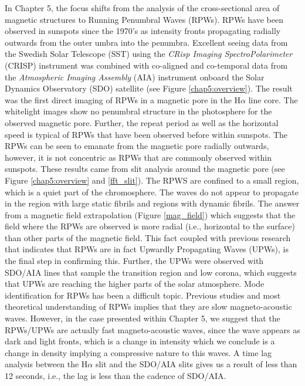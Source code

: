     In Chapter 5, the focus shifts from the analysis of the cross-sectional area of magnetic structures to Running Penumbral Waves (RPWs).
    RPWs have been observed in sunspots since the 1970's as intensity fronts propagating radially outwards from the outer umbra into the penumbra.
    Excellent seeing data from the Swedish Solar Telescope (SST) using the \textit{CRisp Imaging SpectroPolarimeter} (CRISP) instrument was combined with co-aligned and co-temporal data from the \textit{Atmospheric Imaging Assembly} (AIA) instrument onboard the Solar Dynamics Observatory (SDO) satellite (see Figure \ref{chap5:overview}).
    The result was the first direct imaging of RPWs in a magnetic pore in the H$\alpha$ line core.
    The whitelight images show no penumbral structure in the photosphere for the observed magnetic pore.
    Further, the repeat period as well as the horizontal speed is typical of RPWs that have been observed before within sunspots.
    The RPWs can be seen to emanate from the magnetic pore radially outwards, however, it is not concentric as RPWs that are commonly observed within sunspots.
    These results came from slit analysis around the magnetic pore (see Figure \ref{chap5:overview} and \ref{fft_slit}).
    The RPWS are confined to a small region, which is a quiet part of the chromosphere.
    The waves do not appear to propagate in the region with large static fibrils and regions with dynamic fibrils.
    The answer from a magnetic field extrapolation (Figure \ref{mag_field}) which suggests that the field where the RPWs are observed is more radial (i.e., horizontal to the surface) than other parts of the magnetic field.
    This fact coupled with previous research that indicates that RPWs are in fact Upwardly Propagating Waves (UPWs), is the final step in confirming this.     
    Further, the UPWs were observed with SDO/AIA lines that sample the transition region and low corona, which suggests that UPWs are reaching the higher parts of the solar atmosphere.
    Mode identification for RPWs has been a difficult topic. 
    Previous studies and most theoretical understanding of RPWs implies that they are slow magneto-acoustic waves.
    However, in the case presented within Chapter 5, we suggest that the RPWs/UPWs are actually fast magneto-acoustic waves, since the wave appears as dark and light fronts, which is a change in intensity which we conclude is a change in density implying a compressive nature to this waves.
    A time lag analysis between the H$\alpha$ slit and the SDO/AIA slits gives us a result of less than 12 seconds, i.e., the lag is less than the cadence of SDO/AIA.
